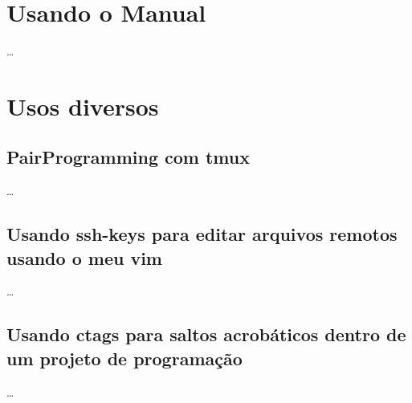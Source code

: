 \documentclass[a4paper,12pt,oneside]{book}
\begin{document}





\newcommand{\vimcommand}[1]{%
    \sethlcolor{lightgray}%
    \textbf{\textcolor{black}{\hl{#1}}}%
}
\newcommand{\vimkeys}[1]{%
    \sethlcolor{gray}%
	    \textbf{\textcolor{white}{\hl{#1}}}%
}
\newcommand{\insertfigure}[3]{
\begin{figure}[!htb]
\centering
\fbox{\texttt{[image: \#2]}}
\caption{#3}
\end{figure}
}













\chapter{Usando o Manual}
\ldots
\newpage

\chapter{Usos diversos}
\section{PairProgramming com tmux}
\ldots
\section{Usando ssh-keys para editar arquivos remotos usando o meu vim}
\ldots
\section{Usando ctags para saltos acrobáticos dentro de um projeto de programação}
\ldots
\end{document}
